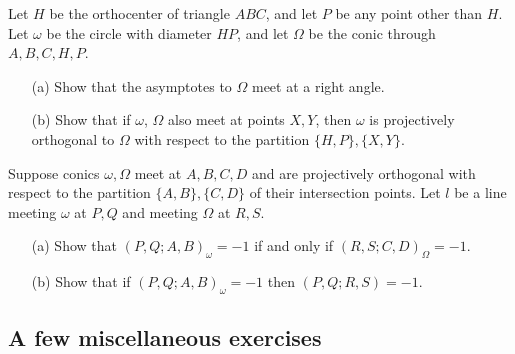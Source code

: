 \begin{exer}\label{orthohyperbola} Let $H$ be the orthocenter of triangle $ABC$, and let $P$ be any point other than $H$. Let $\omega$ be the circle with diameter $HP$, and let $\Omega$ be the conic through $A,B,C,H,P$.
\begin{itemize}
\item[(a)] Show that the asymptotes to $\Omega$ meet at a right angle.

\item[(b)] Show that if $\omega$, $\Omega$ also meet at points $X,Y$, then $\omega$ is projectively orthogonal to $\Omega$ with respect to the partition $\{H,P\},\{X,Y\}$.
\end{itemize}
\end{exer}

\begin{exer} Suppose conics $\omega,\Omega$ meet at $A,B,C,D$ and are projectively orthogonal with respect to the partition $\{A,B\},\{C,D\}$ of their intersection points. Let $l$ be a line meeting $\omega$ at $P,Q$ and meeting $\Omega$ at $R,S$.
\begin{itemize}
\item[(a)] Show that $(P,Q;A,B)_\omega = -1$ if and only if $(R,S;C,D)_{\Omega} = -1$.

\item[(b)] Show that if $(P,Q;A,B)_\omega = -1$ then $(P,Q;R,S) = -1$.
\end{itemize}
\end{exer}

\subsection{A few miscellaneous exercises}

